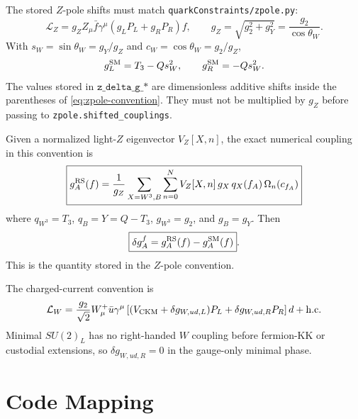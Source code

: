 \documentclass[11pt]{article}
\begin{document}
The stored \(Z\)-pole shifts must match \texttt{quarkConstraints/zpole.py}:
\begin{equation}
  \boxed{
  \mathcal L_Z =
  g_Z Z_\mu\bar f\gamma^\mu
  \left(g_L P_L+g_R P_R\right)f},
  \qquad
  g_Z=\sqrt{g_2^2+g_Y^2}=\frac{g_2}{\cos\theta_W}.
  \label{eq:zpole-convention}
\end{equation}
With \(s_W=\sin\theta_W=g_Y/g_Z\) and \(c_W=\cos\theta_W=g_2/g_Z\),
\begin{equation}
  g_L^{\rm SM}=T_3-Qs_W^2,\qquad
  g_R^{\rm SM}=-Qs_W^2.
  \label{eq:sm-z-couplings}
\end{equation}
The values stored in \(\texttt{z\_delta\_g\_*}\) are dimensionless additive
shifts inside the parentheses of \eqref{eq:zpole-convention}.  They must not
be multiplied by \(g_Z\) before passing to \texttt{zpole.shifted\_couplings}.

Given a normalized light-\(Z\) eigenvector \(V_Z[X,n]\), the exact numerical
coupling in this convention is
\begin{equation}
  \boxed{
  g_A^{\rm RS}(f)
  =
  \frac{1}{g_Z}
  \sum_{X=W^3,B}\sum_{n=0}^{N}
  V_Z[X,n]\,g_X\,q_X(f_A)\,\Omega_n(c_{f_A})}
  \label{eq:exact-z-coupling}
\end{equation}
where \(q_{W^3}=T_3\), \(q_B=Y=Q-T_3\), \(g_{W^3}=g_2\), and \(g_B=g_Y\).
Then
\begin{equation}
  \boxed{\delta g_A^f = g_A^{\rm RS}(f)-g_A^{\rm SM}(f)}.
  \label{eq:stored-delta}
\end{equation}
This is the quantity stored in the \(Z\)-pole convention.

The charged-current convention is
\begin{equation}
  \mathcal L_W =
  \frac{g_2}{\sqrt2} W_\mu^+
  \bar u\gamma^\mu
  \left[(V_{\rm CKM}+\delta g_{W,ud,L})P_L
        +\delta g_{W,ud,R}P_R\right]d
  + {\rm h.c.}
  \label{eq:w-convention}
\end{equation}
Minimal \(SU(2)_L\) has no right-handed \(W\) coupling before fermion-KK or
custodial extensions, so \(\delta g_{W,ud,R}=0\) in the gauge-only minimal
phase.

\section{Code Mapping}
\end{document}
